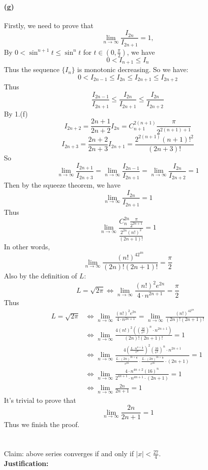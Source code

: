 \documentclass{article}
\def\iff{\Longleftrightarrow}
\def\to{\rightarrow}
\begin{document}
\paragraph[short]{(g)}
{
Firstly, we need to prove that
$$\lim_{n\to\infty}\frac{I_{2n}}{I_{2n+1}}=1,$$
By $0<\sin^{n+1} t\leq \sin^{n}t$ for $t\in(0,\frac{\pi}{2})$, we have
$$0<I_{n+1}\leq I_{n}$$
Thus the sequence $\{I_n\}$ is monotonic decreasing.
So we have:
$$0<I_{2n-1}\leq I_{2n}\leq I_{2n+1}\leq I_{2n+2}$$
Thus
$$\frac{I_{2n-1}}{I_{2n+1}}\leq \frac{I_{2n}}{I_{2n+1}}\leq \frac{I_{2n}}{I_{2n+2}}$$
By 1.(f)
$$I_{2n+2}=\frac{2n+1}{2n+2}I_{2n}=C^{2\left(n+1\right)}_{n+1}\frac{\pi}{2^{2\left(n+1\right)+1}}$$
$$I_{2n+3}=\frac{2n+2}{2n+3}I_{2n+1}=\frac{2^{2\left(n+1\right)}\left(n+1\right)!^2}{\left(2n+3\right)!}$$
So
$$\lim_{n\to\infty}\frac{I_{2n+1}}{I_{2n+3}}=\lim_{n\to\infty}\frac{I_{2n-1}}{I_{2n+1}}=\lim_{n\to\infty}\frac{I_{2n}}{I_{2n+2}}=1$$
Then by the squeeze theorem, we have
$$\lim_{n\to\infty}\frac{I_{2n}}{I_{2n+1}}=1$$
Thus 
$$\lim_{n\to\infty}\frac{C^{2n}_n\frac{\pi}{2^{2n+1}}}{\frac{2^{2n}\left(n!\right)^2}{\left(2n+1\right)!}}=1$$
In other words,
$$\lim_{n\to\infty}\frac{\left(n!\right)^42^{4n}}{\left(2n\right)!\left(2n+1\right)!}=\frac{\pi}{2}$$
Also by the definition of $L$:
$$L=\sqrt{2\pi}\iff \lim_{n\to\infty}\frac{\left(n!\right)^2e^{2n}}{4\cdot n^{2n+1}}=\frac{\pi}{2}$$
Thus
\begin{align*}
L=\sqrt{2\pi}&\iff \lim_{n\to\infty}\frac{\left(n!\right)^2e^{2n}}{4\cdot n^{2n+1}}=\lim_{n\to\infty}\frac{\left(n!\right)^42^{4n}}{\left(2n\right)!\left(2n+1\right)!}\\
&\iff \lim_{n\to\infty}\frac{4\left(n!\right)^2\left(\left(\frac{16}{e^2}\right)^n\cdot n^{2n+1}\right)}{\left(2n\right)!\left(2n+1\right)!}=1\\
&\iff \lim_{n\to\infty}\frac{
    4\left(\frac{L\cdot n^{n+\frac{1}{2}}}{e^n}\right)^2\left(\frac{16}{e^2}\right)^n\cdot n^{2n+1}
}{
    \frac{L\cdot\left(2n\right)^{2n+\frac{1}{2}}}{e^{2n}}\cdot\frac{L\cdot\left(2n\right)^{2n+\frac{1}{2}}}{e^{2n}}\cdot\left(2n+1\right)
}=1\\
&\iff \lim_{n\to\infty}\frac{
    4\cdot n^{4n+2}\left(16\right)^n
}{
    2^{4n+1}\cdot n^{4n+1}\cdot\left(2n+1\right)
}=1\\
&\iff \lim_{n\to\infty}\frac{2n}{2n+1}=1
\end{align*}
It's trivial to prove that
$$\lim_{n\to\infty}\frac{2n}{2n+1}=1$$
Thus we finish the proof.
}

\section{}
Claim: above series converges if and only if $|x|<\frac{27}{4} $. \\
\textbf{Justification:}
\end{document}
